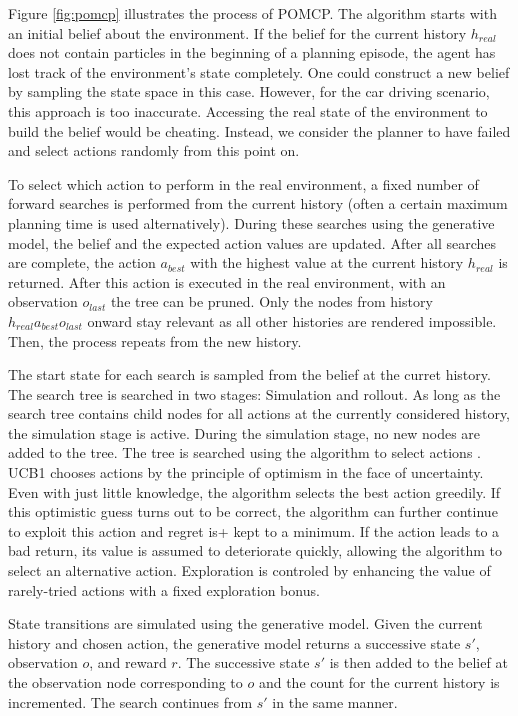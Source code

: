 Figure \ref{fig:pomcp} illustrates the process of POMCP. The algorithm starts with an initial belief about the environment. If the belief for the current history $h_{real}$ does not contain particles in the beginning of a planning episode, the agent has lost track of the environment's state completely. One could construct a new belief by sampling the state space in this case. However, for the car driving scenario, this approach is too inaccurate. Accessing the real state of the environment to build the belief would be cheating. Instead, we consider the planner to have failed and select actions randomly from this point on.

To select which action to perform in the real environment, a fixed number of forward searches is performed from the current history (often a certain maximum planning time is used alternatively). During these searches using the generative model, the belief and the expected action values are updated. After all searches are complete, the action $a_{best}$ with the highest value at the current history $h_{real}$ is returned. After this action is executed in the real environment, with an observation $o_{last}$ the tree can be pruned. Only the nodes from history $h_{real}a_{best}o_{last}$ onward stay relevant as all other histories are rendered impossible. Then, the process repeats from the new history.

The start state for each search is sampled from the belief at the curret history. The search tree is searched in two stages: Simulation and rollout. As long as the search tree contains child nodes for all actions at the currently considered history, the simulation stage is active. During the simulation stage, no new nodes are added to the tree. The tree is searched using the  algorithm to select actions \parencite{ucb1}. UCB1 chooses actions by the principle of optimism in the face of uncertainty. Even with just little knowledge, the algorithm selects the best action greedily. If this optimistic guess turns out to be correct, the algorithm can further continue to exploit this action and regret is+ kept to a minimum. If the action leads to a bad return, its value is assumed to deteriorate quickly, allowing the algorithm to select an alternative action. Exploration is controled by enhancing the value of rarely-tried actions with a fixed exploration bonus. 

State transitions are simulated using the generative model. Given the current history and chosen action, the generative model returns a successive state $s'$, observation $o$, and reward $r$. The successive state $s'$ is then added to the belief at the observation node corresponding to $o$ and the count for the current history is incremented. The search continues from $s'$ in the same manner. 

